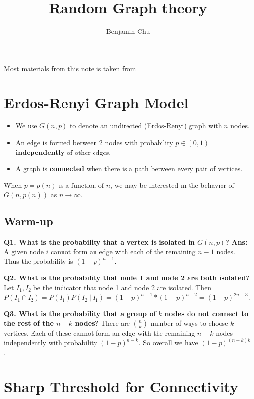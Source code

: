 \documentclass[./some_latex_template.tex]{subfiles}
\begin{document}
\title{Random Graph theory}
\author{Benjamin Chu}
\maketitle

\singlespacing
Most materials from this note is taken from \cite{Acemoglu, Ramchandran}

\section{Erdos-Renyi Graph Model}

\begin{itemize}
	\item We use $G(n, p)$ to denote an undirected (Erdos-Renyi) graph with $n$ nodes.
	\item An edge is formed between 2 nodes with probability $p \in (0, 1)$ \textbf{independently} of other edges. 
	\item A graph is \textbf{connected} when there is a path between every pair of vertices. 
\end{itemize}

\noindent When $p = p(n)$ is a function of $n$, we may be interested in the behavior of $G(n, p(n))$ as $n \rightarrow \infty$. 

\subsection{Warm-up}

\textbf{Q1. What is the probability that a vertex is isolated in $G(n, p)$?} \textbf{Ans:} A given node $i$ cannot form an edge with each of the remaining $n - 1$ nodes. Thus the probability is $(1 - p)^{n-1}$. 

\noindent \textbf{Q2. What is the probability that node 1 and node 2 are both isolated?} Let $I_1, I_2$ be the indicator that node 1 and node 2 are isolated. Then $P(I_1 \cap I_2) = P(I_1)P(I_2 \ | \ I_1)  = (1-p)^{n-1} * (1 - p)^{n - 2} = (1 - p)^{2n-3}$. 

\noindent \textbf{Q3. What is the probability that a group of $k$ nodes do not connect to the rest of the $n-k$ nodes?} There are ${n \choose k}$ number of ways to choose $k$ vertices. Each of these cannot form an edge with the remaining $n-k$ nodes independently with probability $(1-p)^{n-k}$. So overall we have $(1-p)^{(n-k)k}$. 

\section{Sharp Threshold for Connectivity}
\end{document}
